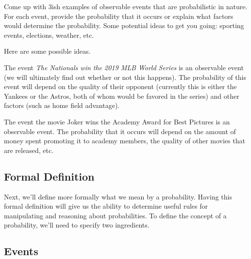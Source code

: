 \documentclass[assignment01_Solutions]{subfiles}
\begin{document}
\vspace{1em}
\begin{exercise}[(10 minutes)]
Come up with 3ish examples of observable events that are probabilistic in nature.  For each event, provide the probability that it occurs or explain what factors would determine the probability.  Some potential ideas to get you going: sporting events, elections, weather, etc.

\begin{boxedsolution}
Here are some possible ideas.
\bi
\item The event \emph{The Nationals win the 2019 MLB World Series} is an observable event (we will ultimately find out whether or not this happens).  The probability of this event will depend on the quality of their opponent (currently this is either the Yankees or the Astros, both of whom would be favored in the series) and other factors (such as home field advantage).
\item The event the movie Joker wins the Academy Award for Best Pictures is an observable event.  The probability that it occurs will depend on the amount of money spent promoting it to academy members, the quality of other movies that are released, etc.
\ei
\end{boxedsolution}

\end{exercise}

\subsection{Formal Definition}

Next, we'll define more formally what we mean by a probability.  Having this formal definition will give us the ability to determine useful rules for manipulating and reasoning about probabilities.  To define the concept of a probability, we'll need to specify two ingredients.
\subsection{Events}
\end{document}
